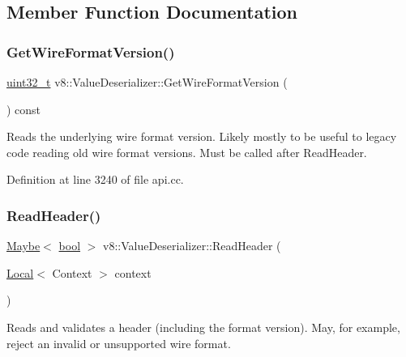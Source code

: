 \subsection{Member Function Documentation}
\mbox{\label{classv8_1_1ValueDeserializer_aaf8a206c11e0663105e570dd4feb01f9}} 
\subsubsection{\texorpdfstring{Get\+Wire\+Format\+Version()}{GetWireFormatVersion()}}
{\footnotesize\ttfamily \mbox{\hyperlink{classuint32__t}{uint32\+\_\+t}} v8\+::\+Value\+Deserializer\+::\+Get\+Wire\+Format\+Version (\begin{DoxyParamCaption}{ }\end{DoxyParamCaption}) const}

Reads the underlying wire format version. Likely mostly to be useful to legacy code reading old wire format versions. Must be called after Read\+Header. 

Definition at line 3240 of file api.\+cc.

\mbox{\label{classv8_1_1ValueDeserializer_a96d813a90d2de3fff2232f0a1e0f3b8b}} 
\subsubsection{\texorpdfstring{Read\+Header()}{ReadHeader()}}
{\footnotesize\ttfamily \mbox{\hyperlink{classv8_1_1Maybe}{Maybe}}$<$ \mbox{\hyperlink{classbool}{bool}} $>$ v8\+::\+Value\+Deserializer\+::\+Read\+Header (\begin{DoxyParamCaption}\item[{\mbox{\hyperlink{classv8_1_1Local}{Local}}$<$ Context $>$}]{context }\end{DoxyParamCaption})}

Reads and validates a header (including the format version). May, for example, reject an invalid or unsupported wire format. 

